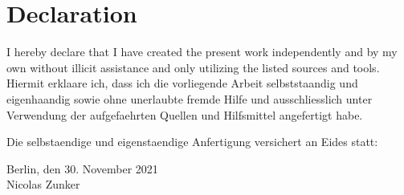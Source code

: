 
\cleardoublepage
\section*{Declaration}
I hereby declare that I have created the present work independently and by my own without illicit assistance and only utilizing the listed sources and tools.\\

Hiermit erklaare ich, dass ich die vorliegende Arbeit selbststaandig und eigenhaandig sowie ohne unerlaubte fremde Hilfe und ausschliesslich unter Verwendung der aufgefaehrten Quellen und Hilfsmittel angefertigt habe.

Die selbstaendige und eigenstaendige Anfertigung versichert an Eides statt:
\begin{center}
Berlin, den 30. November 2021\\[3pc]
Nicolas Zunker
\end{center}

